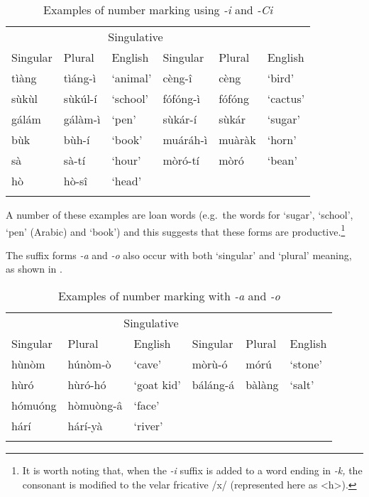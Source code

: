 \documentclass[output=paper]{langsci/langscibook}
\begin{document}
\begin{table}
\begin{tabularx}{\textwidth}{XXXXXX}
\lsptoprule

\multicolumn{3}{c}{ {Plurative}} & \multicolumn{3}{c}{ {Singulative}}\\ \cmidrule(lr){1-3}\cmidrule(lr){4-6}
 {Singular} & {Plural} & {English} & {Singular} & {Plural} & {English}\\ \midrule
 tìàng &  tìáng-ì & ‘animal’ &  cèng-î &  cèng & ‘bird’\\
 sùkùl &  sùkúl-í & ‘school’ &  fófóng-ì &  fófóng & ‘cactus’\\
 gálám &  gálàm-ì & ‘pen’ &  sùkár-í &  sùkár & ‘sugar’\\
 bùk &  bùh-í & ‘book’ &  muáráh-ì &  muàràk & ‘horn’\\
 sà &  sà-tí & ‘hour’ &  mòró-tí &  mòró & ‘bean’\\
 hò &  hò-sî & ‘head’ &  &  & \\
\lspbottomrule
\end{tabularx}
\caption{Examples of number marking using \textit{-i} and \textit{-Ci}}
\label{tab:moodie:10}
\end{table}

A number of these examples are loan words (e.g.\ the words for ‘sugar’, ‘school’, ‘pen’ (Arabic) and ‘book’) and this suggests that these forms are productive.\footnote{It is worth noting that, when the \textit{-i} suffix is added to a word ending in \textit{-k,} the consonant is modified to the velar fricative /x/ (represented here as <h>).} 

The suffix forms \textit{-a }and \textit{-o} also occur with both `singular' and `plural' meaning, as shown in . 

\begin{table}
\begin{tabularx}{\textwidth}{XlXXXX}
\lsptoprule

\multicolumn{3}{c}{ {Plural}} & \multicolumn{3}{c}{ {Singulative}}\\ \cmidrule(lr){1-3}\cmidrule(lr){4-6}
 {Singular} & {Plural} & {English} & {Singular} & {Plural} & {English}\\ \midrule
 hùnòm &  húnòm-ò & ‘cave’ &  mòrù-ó &  mórú & ‘stone’\\
 hùró &  hùró-hó & ‘goat kid’ &  báláng-á &  bàlàng & ‘salt’\\
 hómuóng &  hòmuòng-\^{a} & ‘face’ &  &  & \\
 hárí &  hárí-yà & ‘river’ &  &  & \\
\lspbottomrule
\end{tabularx}
\caption{Examples of number marking with \textit{-a} and \textit{-o}} 
\label{tab:moodie:11}
\end{table}
\end{document}
